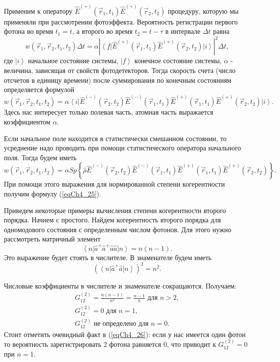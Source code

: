 Применим к оператору $\hat{E}^{(+)}\left(\vec{r}_1, t_1\right)\hat{E}^{(+)}\left(\vec{r}_2,
t_2\right)$ процедуру, которую мы применяли при рассмотрении
фотоэффекта. Вероятность регистрации первого фотона во время $t_1 =
t$, а второго во время $t_2 = t - \tau$ в интервале $\Delta t$ равна
\begin{equation}
w\left(\vec{r}_1, \vec{r}_2, t_1, t_2\right) \Delta t= 
\alpha \left| \left<f\right|
\hat{E}^{(+)}\left(\vec{r}_1, t_1\right)\hat{E}^{(+)}\left(\vec{r}_2,
t_2\right)
\left|i\right>\right|^2 \Delta t,
\nonumber
\end{equation}
где $\left|i\right>$ начальное состояние системы, $\left|f\right>$
конечное состояние системы, $\alpha$ - величина, зависящая от свойств
фотодетекторов. Тогда скорость счета (число отсчетов в единицу
времени) после суммирования по конечным состояниям определяется
формулой
\begin{equation}
w\left(\vec{r}_1, \vec{r}_2, t_1, t_2\right) = 
\alpha \left<i\right|
\hat{E}^{(-)}\left(\vec{r}_2, t_2\right)\hat{E}^{(-)}\left(\vec{r}_1,
t_1\right)
\hat{E}^{(+)}\left(\vec{r}_1, t_1\right)\hat{E}^{(+)}\left(\vec{r}_2,
t_2\right)
\left|i\right>.
\nonumber
\end{equation}
Здесь нас интересует только полевая часть, атомная часть выражается
коэффициентом $\alpha$.

Если начальное поле находится в статистически смешанном состоянии, то
усреднение надо проводить при помощи статистического оператора
начального поля. Тогда будем иметь
\begin{equation}
w\left(\vec{r}_1, \vec{r}_2, t_1, t_2\right) = 
\alpha Sp \left\{\hat{\rho}
\hat{E}^{(-)}\left(\vec{r}_2, t_2\right)\hat{E}^{(-)}\left(\vec{r}_1,
t_1\right)
\hat{E}^{(+)}\left(\vec{r}_1, t_1\right)\hat{E}^{(+)}\left(\vec{r}_2,
t_2\right)
\right\}.
\nonumber
\end{equation}
При помощи этого выражения для нормированной степени
когерентности получим формулу (\ref{eqCh4_25}).

Приведем некоторые примеры вычисления
степени когерентности второго порядка. Начнем с простого. Найдем
когерентность второго порядка для одномодового состояния с
определенным числом фотонов. Для этого нужно рассмотреть матричный
элемент  
\[
\left<n\right|\hat{a}^{+}\hat{a}^{+}\hat{a}\hat{a}\left|n\right> = n
\left(n - 1\right).
\]
Это выражение будет стоять в числителе. В знаменателе будем иметь 
\[
\left(\left<n\right|\hat{a}^{+}\hat{a}\left|n\right>\right)^2 = 
n^2.
\]

Числовые коэффициенты в числителе и знаменателе сокращаются. Получаем:
\begin{eqnarray}
G^{(2)}_{12} = \frac{n\left(n - 1\right)}{n^2} = \frac{n - 1}{n} 
\mbox{ для } n > 2,
\nonumber \\
G^{(2)}_{12} = 0
\mbox{ для } n = 1,
\nonumber \\
G^{(2)}_{12} 
\mbox{ не определено для } n = 0.
\label{eqCh4_26}
\end{eqnarray}
Стоит отметить очевидный факт в (\ref{eqCh4_26}): если у нас имеется
один фотон то вероятность зарегистрировать 2 фотона равняется 0, что
приводит к $G^{(2)}_{12} = 0$ при $n=1$.

